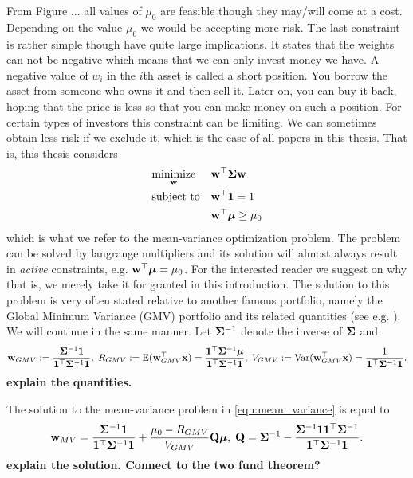 \documentclass[]{book}
\begin{document}
From Figure ... all values of $\mu_0$ are feasible though they may/will come at a cost. 
Depending on the value $\mu_0$ we would be accepting more risk. 
The last constraint is rather simple though have quite large implications. 
It states that the weights can not be negative which means that we can only invest money we have. 
A negative value of $w_i$ in the $i$th asset is called a short position.
You borrow the asset from someone who owns it and then sell it. 
Later on, you can buy it back, hoping that the price is less so that you can make money on such a position. 
For certain types of investors this constraint can be limiting.
We can sometimes obtain less risk if we exclude it, which is the case of all papers in this thesis. That is, this thesis considers
\begin{equation}\label{eqn:mean_variance}
\begin{aligned}
& \underset{\mathbf{w}}{\text{minimize}} 
& & \mathbf{w}^\top \mathbf{\Sigma} \mathbf{w} \\
& \text{subject to}
& & \mathbf{w}^\top \mathbf{1} = 1 \\
& && \mathbf{w}^\top \mbox{\boldmath$\mu$} \geq \mu_0 \\
\end{aligned}
\end{equation}
which is what we refer to the mean-variance optimization problem. 
The problem can be solved by langrange multipliers and its solution will almost always result in \textit{active} constraints, e.g. $\mathbf{w}^\top \mbox{\boldmath$\mu$} = \mu_0$. 
For the interested reader we suggest \citet{} on why that is, we merely take it for granted in this introduction. 
The solution to this problem is very often stated relative to another famous portfolio, namely the Global Minimum Variance (GMV) portfolio and its related quantities (see e.g. \citet{Bodnar2009CaIotEFiEM, bodnar2013equivalence, bauder2018bayesian}). We will continue in the same manner. Let $\mathbf{\Sigma}^{-1}$ denote the inverse of $\mathbf{\Sigma}$ and 
\begin{equation}
	\mathbf{w}_{GMV} := \frac{\mathbf{\Sigma}^{-1}\mathbf{1}}{\mathbf{1}^\top \mathbf{\Sigma}^{-1}\mathbf{1}}, \; R_{GMV} :=\operatorname{E}(\mathbf{w}_{GMV}^\top\mathbf{x}) = \frac{\mathbf{1}^\top\mathbf{\Sigma}^{-1}\mbox{\boldmath$\mu$}}{\mathbf{1}^\top \mathbf{\Sigma}^{-1}\mathbf{1}}, \;
	V_{GMV} := \operatorname{Var}(\mathbf{w}_{GMV}^\top\mathbf{x}) =\frac{1}{\mathbf{1}^\top \mathbf{\Sigma}^{-1}\mathbf{1}}.
\end{equation}
 \textbf{explain the quantities.}
  
The solution to the mean-variance problem in \eqref{eqn:mean_variance} is equal to
\begin{equation}\label{eqn:mean_var_solution}
	\mathbf{w}_{MV} = \frac{\mathbf{\Sigma}^{-1}\mathbf{1}}{\mathbf{1}^\top \mathbf{\Sigma}^{-1}\mathbf{1}} + \frac{\mu_0 - R_{GMV}}{V_{GMV}} \mathbf{Q} \mbox{\boldmath$\mu$},\; \mathbf{Q} = \mathbf{\Sigma}^{-1} - \frac{\mathbf{\Sigma}^{-1} \mathbf{1} \mathbf{1}^\top \mathbf{\Sigma}^{-1}}{\mathbf{1}^\top \mathbf{\Sigma}^{-1} \mathbf{1}}.
\end{equation}
\textbf{explain the solution. Connect to the two fund theorem?}
\end{document}

